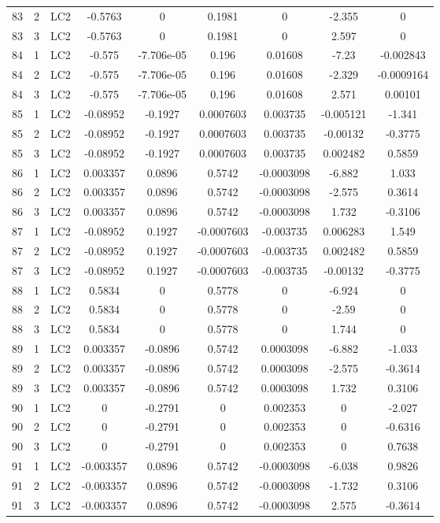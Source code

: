\documentclass{article}%
\begin{document}
\begin{longtable}{| c c c | c c c c c c |}
83&2&LC2&{-}0.5763&0&0.1981&0&{-}2.355&0\\%
83&3&LC2&{-}0.5763&0&0.1981&0&2.597&0\\%
84&1&LC2&{-}0.575&{-}7.706e{-}05&0.196&0.01608&{-}7.23&{-}0.002843\\%
84&2&LC2&{-}0.575&{-}7.706e{-}05&0.196&0.01608&{-}2.329&{-}0.0009164\\%
84&3&LC2&{-}0.575&{-}7.706e{-}05&0.196&0.01608&2.571&0.00101\\%
85&1&LC2&{-}0.08952&{-}0.1927&0.0007603&0.003735&{-}0.005121&{-}1.341\\%
85&2&LC2&{-}0.08952&{-}0.1927&0.0007603&0.003735&{-}0.00132&{-}0.3775\\%
85&3&LC2&{-}0.08952&{-}0.1927&0.0007603&0.003735&0.002482&0.5859\\%
86&1&LC2&0.003357&0.0896&0.5742&{-}0.0003098&{-}6.882&1.033\\%
86&2&LC2&0.003357&0.0896&0.5742&{-}0.0003098&{-}2.575&0.3614\\%
86&3&LC2&0.003357&0.0896&0.5742&{-}0.0003098&1.732&{-}0.3106\\%
87&1&LC2&{-}0.08952&0.1927&{-}0.0007603&{-}0.003735&0.006283&1.549\\%
87&2&LC2&{-}0.08952&0.1927&{-}0.0007603&{-}0.003735&0.002482&0.5859\\%
87&3&LC2&{-}0.08952&0.1927&{-}0.0007603&{-}0.003735&{-}0.00132&{-}0.3775\\%
88&1&LC2&0.5834&0&0.5778&0&{-}6.924&0\\%
88&2&LC2&0.5834&0&0.5778&0&{-}2.59&0\\%
88&3&LC2&0.5834&0&0.5778&0&1.744&0\\%
89&1&LC2&0.003357&{-}0.0896&0.5742&0.0003098&{-}6.882&{-}1.033\\%
89&2&LC2&0.003357&{-}0.0896&0.5742&0.0003098&{-}2.575&{-}0.3614\\%
89&3&LC2&0.003357&{-}0.0896&0.5742&0.0003098&1.732&0.3106\\%
90&1&LC2&0&{-}0.2791&0&0.002353&0&{-}2.027\\%
90&2&LC2&0&{-}0.2791&0&0.002353&0&{-}0.6316\\%
90&3&LC2&0&{-}0.2791&0&0.002353&0&0.7638\\%
91&1&LC2&{-}0.003357&0.0896&0.5742&{-}0.0003098&{-}6.038&0.9826\\%
91&2&LC2&{-}0.003357&0.0896&0.5742&{-}0.0003098&{-}1.732&0.3106\\%
91&3&LC2&{-}0.003357&0.0896&0.5742&{-}0.0003098&2.575&{-}0.3614\\%

\end{longtable}
\end{document}
